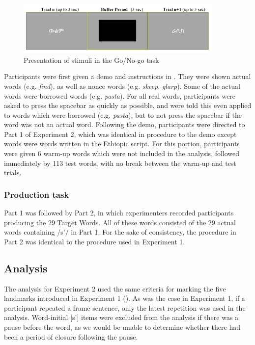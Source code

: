 \documentclass[output=paper,newtxmath,modfonts,nonflat,final]{langsci/langscibook}
\begin{document}
   

\begin{figure}
\includegraphics[width=0.9\textwidth]{figures/fig-moeng-4}
\caption{Presentation of stimuli in the Go/No-go task}
\label{fig:moeng:5}
\end{figure}

Participants were first given a demo and instructions in . They were shown actual  words (e.g. \textit{find}), as well as nonce words (e.g. \textit{skeep}, \textit{glarp}). Some of the actual words were borrowed words (e.g. \textit{pasta}). For all real words, participants were asked to press the spacebar as quickly as possible, and were told this even applied to words which were borrowed (e.g. \textit{pasta}), but to not press the spacebar if the word was not an actual  word. Following the  demo, participants were directed to Part 1 of Experiment 2, which was identical in procedure to the  demo except words were  words written in the Ethiopic script. For this portion, participants were given 6 warm-up words which were not included in the analysis, followed immediately by 113 test words, with no break between the warm-up and test trials.

\subsubsection{Production task}\label{sec:moeng:6.1.2.2}

Part 1 was followed by Part 2, in which experimenters recorded participants producing the 29 Target Words. All of these words consisted of the 29 actual words containing /s’/ in Part 1. For the sake of consistency, the procedure in Part 2 was identical to the procedure used in Experiment 1.

\subsection{Analysis}\label{sec:moeng:6.2}

The analysis for Experiment 2 used the same criteria for marking the five landmarks introduced in Experiment 1 (). As was the case in Experiment 1, if a participant repeated a frame sentence, only the latest repetition was used in the analysis. Word-initial [s’] items were excluded from the analysis if there was a pause before the word, as we would be unable to determine whether there had been a period of closure following the pause.
\end{document}
